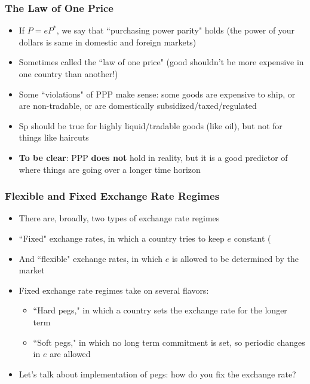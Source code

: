 \documentclass{beamer}
\begin{document}
\begin{frame}
\frametitle[alignment=center]{The Law of One Price}
\begin{itemize}
\item If $P=eP^*$, we say that  ``purchasing power parity" holds (the power of your dollars is same in domestic and foreign markets)
\bigskip
\item Sometimes called the ``law of one price" (good shouldn't be more expensive in one country than another!)
\bigskip
\item Some ``violations" of PPP make sense:  some goods are expensive to ship, or are non-tradable, or are domestically subsidized/taxed/regulated
\bigskip
\item Sp should be true for highly liquid/tradable goods (like oil), but not for things like haircuts
\bigskip
\item \textbf{To be clear}:  PPP \textbf{does not} hold in reality, but it is a good predictor of where things are going over a longer time horizon
\end{itemize}
\end{frame}

\begin{frame}
\frametitle[alignment=center]{Flexible and Fixed Exchange Rate Regimes}
\begin{itemize}
\item There are, broadly, two types of exchange rate regimes
\bigskip
\item ``Fixed" exchange rates, in which a country tries to keep $e$ constant (
\bigskip
\item And ``flexible" exchange rates, in which $e$ is allowed to be determined by the market 
\bigskip
\item Fixed exchange rate regimes take on several flavors:
\begin{itemize}
\item ``Hard pegs," in which a country sets the exchange rate for the longer term
\item ``Soft pegs," in which no long term commitment is set, so periodic changes in $e$ are allowed
\end{itemize}
\item Let's talk about implementation of pegs: how do you fix the exchange rate?
\end{itemize}
\end{frame}
\end{document}
